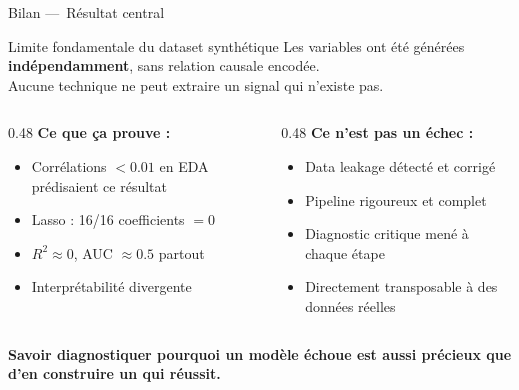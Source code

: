 \documentclass[12pt]{beamer}
\begin{document}
\begin{frame}{Bilan ---~Résultat central}

\begin{block}{\alert{Limite fondamentale du dataset synthétique}}
Les variables ont été générées \textbf{indépendamment}, sans relation causale encodée.\\
Aucune technique ne peut extraire un signal qui n'existe pas.
\end{block}

\bigskip

\begin{columns}[T]
\begin{column}{0.48\textwidth}
\textbf{Ce que ça prouve :}
\begin{itemize}
  \item Corrélations $< 0.01$ en EDA prédisaient ce résultat
  \item Lasso : 16/16 coefficients $= 0$
  \item $R^2 \approx 0$, AUC $\approx 0.5$ partout
  \item Interprétabilité divergente
\end{itemize}
\end{column}

\begin{column}{0.48\textwidth}
\textbf{Ce n'est pas un échec :}
\begin{itemize}
  \item Data leakage détecté et corrigé
  \item Pipeline rigoureux et complet
  \item Diagnostic critique mené à chaque étape
  \item Directement transposable à des données réelles
\end{itemize}
\end{column}
\end{columns}

\bigskip

\textcolor{bleuaccent}{\textbf{Savoir diagnostiquer pourquoi un modèle échoue est aussi précieux que d'en construire un qui réussit.}}

\end{frame}
\end{document}
